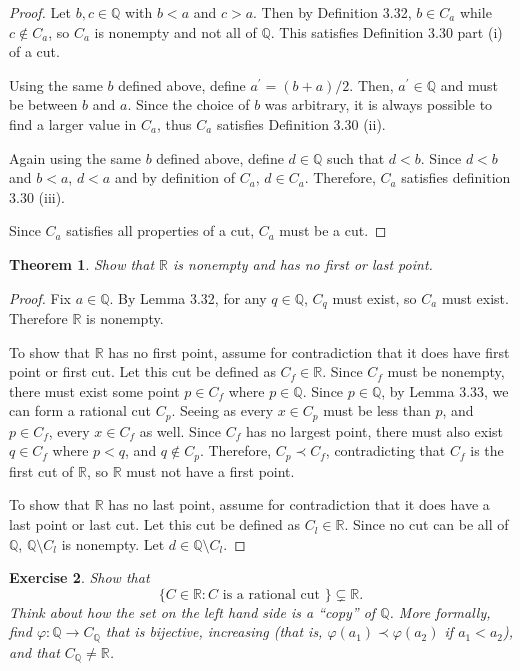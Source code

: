 \documentclass{amsart}
\newtheorem{theorem}{Theorem}
\newtheorem{exercise}[theorem]{Exercise}
\newcommand{\Q}{\mathbb Q}
\newcommand{\R}{\mathbb R}
\newcommand{\1}{\mathds{1}}
\def \R {{\mathbb {R}}}
\def \phi {{\varphi}}
\numberwithin{equation}{section}
\numberwithin{theorem}{section}
\begin{document}
\begin{proof}
	Let $b,c\in\Q$ with $b<a$ and $c>a$. Then by Definition 3.32, $b\in C_a$ while $c\notin C_a$, so $C_a$ is nonempty and not all of $\Q$. This satisfies Definition 3.30 part (i) of a cut.
	
	Using the same $b$ defined above, define $a^\prime = (b+a)/2$. Then, $a^\prime\in\Q$ and must be between $b$ and $a$. Since the choice of $b$ was arbitrary, it is always possible to find a larger value in $C_a$, thus $C_a$ satisfies Definition 3.30 (ii).
	
	Again using the same $b$ defined above, define $d\in\Q$ such that $d<b$. Since $d<b$ and $b<a$, $d<a$ and by definition of $C_a$, $d\in C_a$. Therefore, $C_a$ satisfies definition 3.30 (iii).
	
	Since $C_a$ satisfies all properties of a cut, $C_a$ must be a cut. 
\end{proof}


\begin{theorem}
	Show that $\R$ is nonempty and has no first or last point.
\end{theorem}

\begin{proof}
	Fix $a\in\Q$. By Lemma 3.32, for any $q\in\Q$, $C_q$ must exist, so $C_a$ must exist. Therefore $\R$ is nonempty.
	
	To show that $\R$ has no first point, assume for contradiction that it does have first point or first cut. Let this cut be defined as $C_f\in\R$. Since $C_f$ must be nonempty, there must exist some point $p\in C_f$ where $p\in \Q$. Since $p\in \Q$, by Lemma 3.33, we can form a rational cut $C_p$. Seeing as every $x\in C_p$ must be less than $p$, and $p\in C_f$, every $x\in C_f$ as well. Since $C_f$ has no largest point, there must also exist $q\in C_f$ where $p<q$, and $q\notin C_p$. Therefore, $C_p \prec C_f$, contradicting that $C_f$ is the first cut of $\R$, so $\R$ must not have a first point.
	
	To show that $\R$ has no last point, assume for contradiction that it does have a last point or last cut. Let this cut be defined as $C_l\in\R$. Since no cut can be all of $\Q$, $\Q\setminus C_l$ is nonempty. Let $d\in \Q\setminus C_l$. 
\end{proof}

\begin{exercise}
	Show that
	\[
	\{ C \in \R : C \text{ is a rational cut } \}
	\subsetneq \R.
	\]
	Think about how the set on the left hand side is a ``copy'' of $\Q$.  More formally, find $\phi: \Q \to C_\Q$ that is bijective, increasing (that is, $\phi(a_1) \prec \phi(a_2)$ if $a_1 < a_2$), and that $C_\Q \neq \R$.
\end{exercise}
\end{document}
